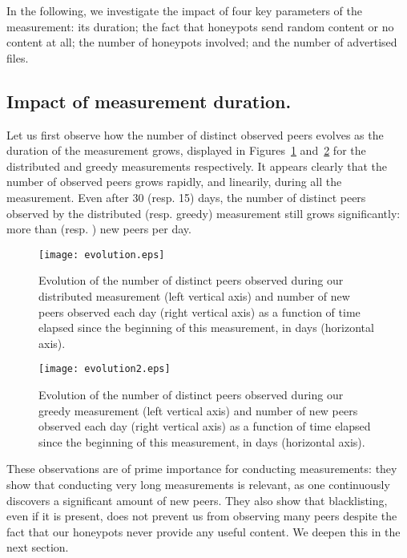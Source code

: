 \documentclass[final,
notitlepage,
narroweqnarray,
	inline,
	twoside,
]{ieee}
\begin{document}
In the following, we investigate the impact of four key parameters of
the measurement: its duration; the fact that honeypots send random
content or no content at all; the number of honeypots involved; and
the number of advertised files.

\subsection{Impact of measurement duration.}
\label{sec-duration}

Let us first observe how the number of distinct observed peers evolves as the duration of the measurement grows, displayed in Figures~\ref{fig-nbpeers-distributed} and~\ref{fig-nbpeers-greedy} for the distributed and greedy measurements respectively. It appears clearly that the number of observed peers grows rapidly, and linearily, during all the measurement. Even after 30 (resp. 15) days, the number of distinct peers observed by the distributed (resp. greedy) measurement still grows significantly: more than  (resp. ) new peers per day.

\begin{figure}[h!]
\centering
\texttt{[image: evolution.eps]}
\caption{Evolution of the number of distinct peers observed during our distributed measurement (left vertical axis) and number of new peers observed each day (right vertical axis) as a function of time elapsed since the beginning of this measurement, in days (horizontal axis).}
\label{fig-nbpeers-distributed}
\end{figure}

\begin{figure}[h!]
\centering
\texttt{[image: evolution2.eps]}
\caption{Evolution of the number of distinct peers observed during our greedy measurement (left vertical axis) and number of new peers observed each day (right vertical axis) as a function of time elapsed since the beginning of this measurement, in days (horizontal axis).}
\label{fig-nbpeers-greedy}
\end{figure}

These observations are of prime importance for conducting measurements: they show that conducting very long measurements is relevant, as one continuously discovers a significant amount of new peers. They also show that blacklisting, even if it is present, does not prevent us from observing many peers despite the fact that our honeypots never provide any useful content. We deepen this in the next section.
\end{document}
